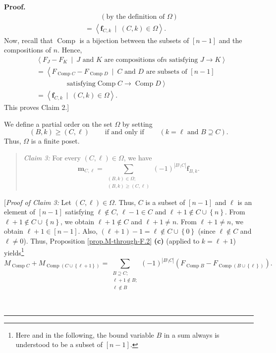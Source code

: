 \documentclass[numbers=enddot,12pt,final,onecolumn,notitlepage]{scrartcl}%
\theoremstyle{definition}
\newenvironment{statement}{\begin{quote}}{\end{quote}}
\newenvironment{proof}[1][Proof]{\noindent\textbf{#1.} }{\ \rule{0.5em}{0.5em}}
\newenvironment{verlong}{}{}
\let\sumnonlimits\sum
\renewcommand{\sum}{\sumnonlimits\limits}
\begin{document}
\begin{verlong}
\begin{proof}
\begin{align*}
&  \ \ \ \ \ \ \ \ \ \ \left(  \text{by the definition of }\Omega\right) \\
&  =\left\langle \mathbf{f}_{C,k}\ \mid\ \left(  C,k\right)  \in
\Omega\right\rangle .
\end{align*}
Now, recall that $\operatorname*{Comp}$ is a bijection between the subsets of
$\left[  n-1\right]  $ and the compositions of $n$. Hence,%
\begin{align*}
&  \left\langle F_{J}-F_{K}\ \mid\ J\text{ and }K\text{ are compositions of
}n\text{ satisfying }J\rightarrow K\right\rangle \\
&  =\left\langle F_{\operatorname*{Comp}C}-F_{\operatorname*{Comp}D}%
\ \mid\ C\text{ and }D\text{ are subsets of }\left[  n-1\right]  \right. \\
&  \ \ \ \ \ \ \ \ \ \ \ \ \ \ \ \ \ \ \ \ \left.  \text{satisfying
}\operatorname*{Comp}C\rightarrow\operatorname*{Comp}D\right\rangle \\
&  =\left\langle \mathbf{f}_{C,k}\ \mid\ \left(  C,k\right)  \in
\Omega\right\rangle .
\end{align*}
This proves Claim 2.]

We define a partial order on the set $\Omega$ by setting%
\[
\left(  B,k\right)  \geq\left(  C,\ell\right)  \ \ \ \ \ \ \ \ \ \ \text{if
and only if}\ \ \ \ \ \ \ \ \ \ \left(  k=\ell\text{ and }B\supseteq C\right)
.
\]
Thus, $\Omega$ is a finite poset.

\begin{statement}
\textit{Claim 3:} For every $\left(  C,\ell\right)  \in\Omega$, we have%
\[
\mathbf{m}_{C,\ell}=\sum_{\substack{\left(  B,k\right)  \in\Omega;\\\left(
B,k\right)  \geq\left(  C,\ell\right)  }}\left(  -1\right)  ^{\left\vert
B\setminus C\right\vert }\mathbf{f}_{B,k}.
\]

\end{statement}

[\textit{Proof of Claim 3:} Let $\left(  C,\ell\right)  \in\Omega$. Thus, $C$
is a subset of $\left[  n-1\right]  $ and $\ell$ is an element of $\left[
n-1\right]  $ satisfying $\ell\notin C$, $\ell-1\in C$ and $\ell+1\notin
C\cup\left\{  n\right\}  $. From $\ell+1\notin C\cup\left\{  n\right\}  $, we
obtain $\ell+1\notin C$ and $\ell+1\neq n$. From $\ell+1\neq n$, we obtain
$\ell+1\in\left[  n-1\right]  $. Also, $\left(  \ell+1\right)  -1=\ell\notin
C\cup\left\{  0\right\}  $ (since $\ell\notin C$ and $\ell\neq0$). Thus,
Proposition \ref{prop.M-through-F.2} \textbf{(c)} (applied to $k=\ell+1$)
yields\footnote{Here and in the following, the bound variable $B$ in a sum
always is understood to be a subset of $\left[  n-1\right]  $.}%
\[
M_{\operatorname*{Comp}C}+M_{\operatorname*{Comp}\left(  C\cup\left\{
\ell+1\right\}  \right)  }=\sum_{\substack{B\supseteq C;\\\ell+1\notin
B;\\\ell\notin B}}\left(  -1\right)  ^{\left\vert B\setminus C\right\vert
}\left(  F_{\operatorname*{Comp}B}-F_{\operatorname*{Comp}\left(
B\cup\left\{  \ell\right\}  \right)  }\right)  .
\]



\end{proof}
\end{verlong}
\end{document}
